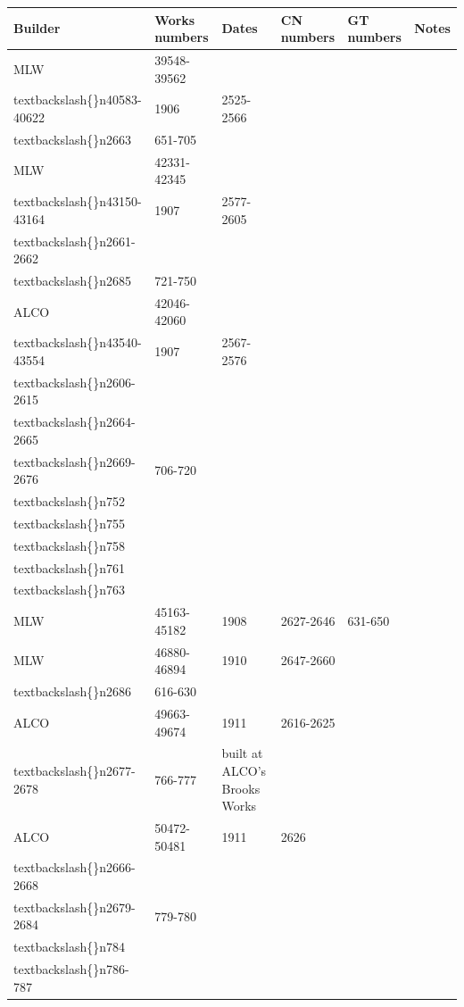 \documentclass{article}
\begin{document}
\begin{tabular}{llllll}
\toprule
Builder & Works numbers & Dates & CN numbers & GT numbers & Notes \\
\midrule
MLW & 39548-39562\\textbackslash\{\}n40583-40622 & 1906 & 2525-2566\\textbackslash\{\}n2663 & 651-705 &  \\
MLW & 42331-42345\\textbackslash\{\}n43150-43164 & 1907 & 2577-2605\\textbackslash\{\}n2661-2662\\textbackslash\{\}n2685 & 721-750 &  \\
ALCO & 42046-42060\\textbackslash\{\}n43540-43554 & 1907 & 2567-2576\\textbackslash\{\}n2606-2615\\textbackslash\{\}n2664-2665\\textbackslash\{\}n2669-2676 & 706-720\\textbackslash\{\}n752\\textbackslash\{\}n755\\textbackslash\{\}n758\\textbackslash\{\}n761\\textbackslash\{\}n763 &  \\
MLW & 45163-45182 & 1908 & 2627-2646 & 631-650 &  \\
MLW & 46880-46894 & 1910 & 2647-2660\\textbackslash\{\}n2686 & 616-630 &  \\
ALCO & 49663-49674 & 1911 & 2616-2625\\textbackslash\{\}n2677-2678 & 766-777 & built at ALCO's Brooks Works \\
ALCO & 50472-50481 & 1911 & 2626\\textbackslash\{\}n2666-2668\\textbackslash\{\}n2679-2684 & 779-780\\textbackslash\{\}n784\\textbackslash\{\}n786-787 &  \\
\bottomrule
\end{tabular}
\end{document}
